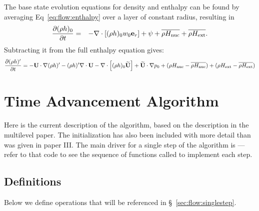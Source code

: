 The base state evolution equations for density and enthalpy can be
found by averaging Eq~\ref{eq:flow:enthalpy}
over a layer of constant radius, resulting in
\begin{eqnarray}
\frac{\partial(\rho h)_0}{\partial t} &=& -\nabla\cdot\left[(\rho h)_0w_0{\bf e}_r\right] +
  \psi + \overline{\rho {H_{\rm nuc}}} + \overline{\rho {H_{\rm ext}}}. \label{eq:flow:enthalpy_base}
\end{eqnarray}
Subtracting it from the full enthalpy equation gives:
\begin{equation}
\frac{\partial(\rho h)'}{\partial t} = -{\bf U}\cdot\nabla(\rho h)' - (\rho h)'\nabla\cdot{\bf U} - 
  \nabla\cdot\left[(\rho h)_0\widetilde{{\bf U}}\right] + \widetilde{{\bf U}}\cdot\nabla p_0 
   + ( \rho{H_{\rm nuc}} - \overline{\rho {H_{\rm nuc}}}) + (\rho{H_{\rm ext}} - \overline{\rho {H_{\rm ext}}}) 
\label{eq:flow:rhohprime}
\end{equation}




\section{Time Advancement Algorithm}\label{Sec:Time Advancement Algorithm}
Here is the current description of the algorithm, based on the
description in the multilevel paper.  The initialization has also been
included with more detail than was given in paper III.  The main
driver for a single step of the algorithm is ---refer
to that code to see the sequence of functions called to implement each
step.


\subsection{Definitions}
Below we define operations that will be referenced in
\S~\ref{sec:flow:singlestep}.

